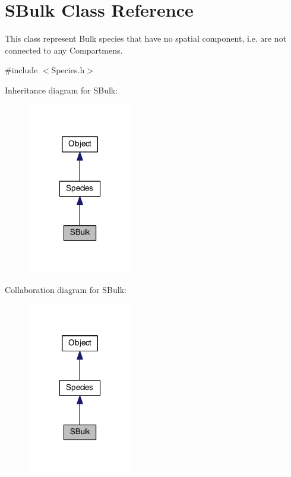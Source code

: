 \hypertarget{classSBulk}{\section{S\-Bulk Class Reference}
\label{classSBulk}
}


This class represent Bulk species that have no spatial component, i.\-e. are not connected to any Compartmens.  




{\ttfamily \#include $<$Species.\-h$>$}



Inheritance diagram for S\-Bulk\-:\nopagebreak
\begin{figure}[H]
\begin{center}
\leavevmode
\includegraphics[width=130pt]{classSBulk__inherit__graph}
\end{center}
\end{figure}


Collaboration diagram for S\-Bulk\-:\nopagebreak
\begin{figure}[H]
\begin{center}
\leavevmode
\includegraphics[width=130pt]{classSBulk__coll__graph}
\end{center}
\end{figure}
